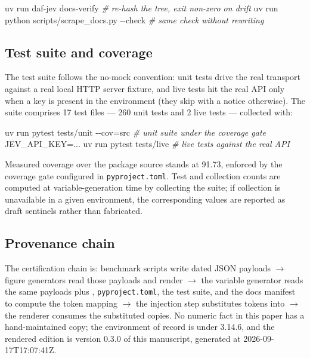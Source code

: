 \documentclass[
  english,
]{article}
\newenvironment{Shaded}{}{}
\newcommand{\AttributeTok}[1]{\textcolor[rgb]{0.49,0.56,0.16}{#1}}
\newcommand{\CommentTok}[1]{\textcolor[rgb]{0.38,0.63,0.69}{\textit{#1}}}
\newcommand{\ExtensionTok}[1]{#1}
\newcommand{\NormalTok}[1]{#1}
\newcommand{\OperatorTok}[1]{\textcolor[rgb]{0.40,0.40,0.40}{#1}}
\newcommand{\VariableTok}[1]{\textcolor[rgb]{0.10,0.09,0.49}{#1}}
\begin{document}
\begin{itemize}
\begin{Shaded}
\begin{Highlighting}[]
\ExtensionTok{uv}\NormalTok{ run daf{-}jev docs{-}verify                 }\CommentTok{\# re{-}hash the tree, exit non{-}zero on drift}
\ExtensionTok{uv}\NormalTok{ run python scripts/scrape\_docs.py }\AttributeTok{{-}{-}check}   \CommentTok{\# same check without rewriting}
\end{Highlighting}
\end{Shaded}
\end{itemize}

\subsection{Test suite and coverage}\label{test-suite-and-coverage}

The test suite follows the no-mock convention: unit tests drive the real
transport against a real local HTTP server fixture, and live tests hit
the real API only when a key is present in the environment (they skip
with a notice otherwise). The suite comprises 17 test files --- 260 unit
tests and 2 live tests --- collected with:

\begin{Shaded}
\begin{Highlighting}[]
\ExtensionTok{uv}\NormalTok{ run pytest tests/unit }\AttributeTok{{-}{-}cov}\OperatorTok{=}\NormalTok{src     }\CommentTok{\# unit suite under the coverage gate}
\VariableTok{JEV\_API\_KEY}\OperatorTok{=}\NormalTok{... }\ExtensionTok{uv}\NormalTok{ run pytest tests/live   }\CommentTok{\# live tests against the real API}
\end{Highlighting}
\end{Shaded}

Measured coverage over the package source stands at 91.73, enforced by
the coverage gate configured in \texttt{pyproject.toml}. Test and
collection counts are computed at variable-generation time by collecting
the suite; if collection is unavailable in a given environment, the
corresponding values are reported as draft sentinels rather than
fabricated.

\subsection{Provenance chain}\label{provenance-chain}

The certification chain is: benchmark scripts write dated JSON payloads
\texorpdfstring{\ensuremath{\to}}{->} figure generators read those payloads and render
 \texorpdfstring{\ensuremath{\to}}{->} the variable generator reads the same
payloads plus , \texttt{pyproject.toml},
the test suite, and the docs manifest to compute the token mapping \texorpdfstring{\ensuremath{\to}}{->} the
injection step substitutes tokens into  \texorpdfstring{\ensuremath{\to}}{->}
the renderer consumes the substituted copies. No numeric fact in this
paper has a hand-maintained copy; the environment of record is
 under 3.14.6, and the
rendered edition is version 0.3.0 of this manuscript, generated at
2026-09-17T17:07:41Z.
\end{document}
